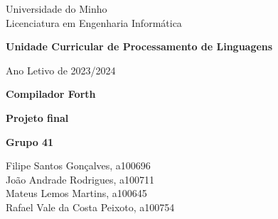 \documentclass{article}
\begin{document}
\begin{titlepage}
    \centering
    
    {\small Universidade do Minho \\
    Licenciatura em Engenharia Informática \par}
    
    \vspace*{\fill} %

    {\huge\bfseries Unidade Curricular de Processamento de Linguagens \par}
    
    \vspace{0.5cm} %
    
    {\normalsize Ano Letivo de 2023/2024 \par}
    
    \vspace{1cm} %
    
    \hrulefill %
    
    \vspace{1cm} %
    
    {\huge\bfseries Compilador Forth \par}
    
    \vspace{0.5cm} %

    
    {\large\bfseries Projeto final \par}

    \vspace{1cm} %
    
    \hrulefill %
    
    \vspace{2cm} %

    {\bfseries Grupo 41 \\}
        {\normalsize Filipe Santos Gonçalves, a100696 \\ João Andrade Rodrigues, a100711 \\ Mateus Lemos Martins, a100645 \\ Rafael Vale da Costa Peixoto, a100754 \par}
    
    \vspace*{\fill} %
    
\end{titlepage}
\end{document}
